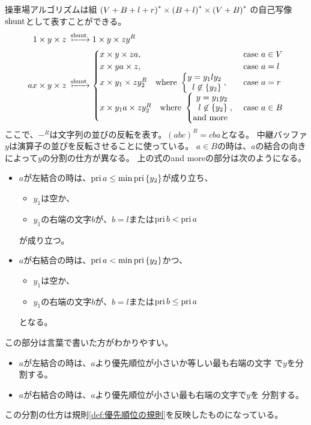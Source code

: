 {	操車場アルゴリズムは組
	$\mathinner{({V+B+l+r})}^*\times\mathinner{({B+l})}^*\times\mathinner{({V+B})}^*$
	の自己写像$\mathinner{\operatorname{shunt}}$として表すことができる。
	\begin{equation*}\begin{split}
		1\times y\times z &\xmapsto{\op{shunt}} 1\times y\times zy^R \\
		ax\times y\times z &\xmapsto{\op{shunt}}
		\begin{cases}
			x\times y\times za, &\text{ case } a\in V \\
			x\times ya\times z, &\text{ case } a = l \\
			x\times y_1\times zy_2^R \quad\text{where }\left\{\begin{split}
				y = y_1ly_2 \\
				l \not\in \set{y_2} \\
			\end{split}\right., &\text{ case } a = r \\
			x\times y_1a\times zy_2^R \quad\text{where }\left\{\begin{split}
				y = y_1y_2 \\
				l \not\in \set{y_2} \\
				\text{and more}
			\end{split}\right., &\text{ case } a\in B \\
		\end{cases} \\
	\end{split}\end{equation*}
	ここで、$-^R$は文字列の並びの反転を表す。$(abc)^R=cba$となる。
	中継バッファ$y$は演算子の並びを反転させることに使っている。
	$a\in B$の時は、$a$の結合の向きによって$y$の分割の仕方が異なる。
	上の式のand moreの部分は次のようになる。
	\begin{itemize}\setlength{\itemsep}{-1mm} %
		\item $a$が左結合の時は、$\mathinner{\operatorname{pri}}a\le\min\mathinner{\operatorname{pri}}\mathinner{\{{y_2}\}}$が成り立ち、
		\begin{itemize}\setlength{\itemsep}{-1mm} %
			\item $y_1$は空か、
			\item $y_1$の右端の文字$b$が、$b=l$または$\mathinner{\operatorname{pri}}b<\mathinner{\operatorname{pri}}a$
		\end{itemize} %
		が成り立つ。
		\item $a$が右結合の時は、$\mathinner{\operatorname{pri}}a<\min\mathinner{\operatorname{pri}}\mathinner{\{{y_2}\}}$かつ、
		\begin{itemize}\setlength{\itemsep}{-1mm} %
			\item $y_1$は空か、
			\item $y_1$の右端の文字$b$が、$b=l$または$\mathinner{\operatorname{pri}}b\le\mathinner{\operatorname{pri}}a$
		\end{itemize} %
		となる。
	\end{itemize} %
	この部分は言葉で書いた方がわかりやすい。
	\begin{itemize}\setlength{\itemsep}{-1mm} %
		\item $a$が左結合の時は、$a$より優先順位が小さいか等しい最も右端の文字
		で$y$を分割する。
		\item $a$が右結合の時は、$a$より優先順位が小さい最も右端の文字で$y$を
		分割する。
	\end{itemize} %
	この分割の仕方は規則\ref{def:優先順位の規則}を反映したものになっている。

}
